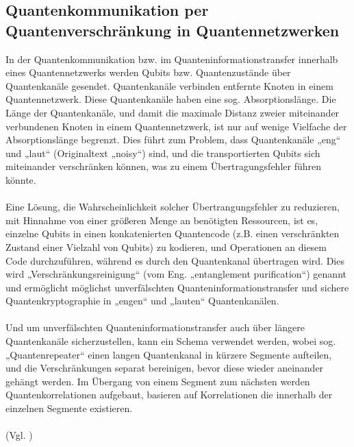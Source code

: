 \subsection{Quantenkommunikation per Quantenverschränkung in Quantennetzwerken}
In der Quantenkommunikation bzw. im Quanteninformationstransfer innerhalb eines Quantennetzwerks werden Qubits bzw. Quantenzustände über Quantenkanäle gesendet. Quantenkanäle verbinden entfernte Knoten in einem Quantennetzwerk. Diese Quantenkanäle haben eine sog. Absorptionslänge. Die Länge der Quantenkanäle, und damit die maximale Distanz zweier miteinander verbundenen Knoten in einem Quantennetzwerk, ist nur auf wenige Vielfache der Absorptionslänge begrenzt. Dies führt zum Problem, dass Quantenkanäle „eng“ und „laut“ (Originaltext „noisy“) sind, und die transportierten Qubits sich miteinander verschränken können, was zu einem Übertragungsfehler führen könnte.\\
\\
Eine Lösung, die Wahrscheinlichkeit solcher Übertrangungsfehler zu reduzieren, mit Hinnahme von einer größeren Menge an benötigten Ressourcen, ist es, einzelne Qubits in einen konkatenierten Quantencode (z.B. einen verschränkten Zustand einer Vielzahl von Qubits) zu kodieren, und Operationen an diesem Code durchzuführen, während es durch den Quantenkanal übertragen wird. Dies wird „Verschränkungsreinigung“ (vom Eng. „entanglement purification“) genannt und ermöglicht möglichst unverfälschten Quanteninformationstransfer und sichere Quantenkryptographie in „engen“ und „lauten“ Quantenkanälen.\\
\\
Und um unverfälschten Quanteninformationstransfer auch über längere Quantenkanäle sicherzustellen, kann ein Schema verwendet werden, wobei sog. „Quantenrepeater“ einen langen Quantenkanal in kürzere Segmente aufteilen, und die Verschränkungen separat bereinigen, bevor diese wieder aneinander gehängt werden. Im Übergang von einem Segment zum nächsten werden Quantenkorrelationen aufgebaut, basieren auf Korrelationen die innerhalb der einzelnen Segmente existieren.\\
\\
(Vgl. \cite[S.1-2]{dur_quantum_1999})

